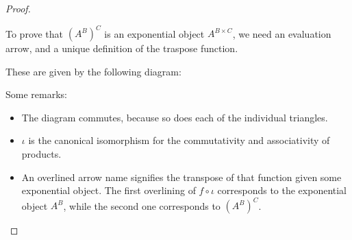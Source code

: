 \documentclass[a4paper,notitlepage]{article}
\begin{document}
\begin{enumerate}
\begin{enumerate}
\begin{proof}
\begin{description}
          To prove that $(A^B)^C$ is an exponential object $A^{B \times C}$,
          we need an evaluation arrow, and a unique definition
          of the traspose function.
            
          These are given by the following diagram: 
      

      Some remarks:

      \begin{itemize}
        \item The diagram commutes, because so does each of the individual
          triangles.
          
        \item $\iota$ is the canonical isomorphism for the commutativity and
      associativity of products. 

      \item An overlined arrow name signifies the transpose of that function
      given some exponential object. The first overlining of $f \circ ι$ corresponds to the
      exponential object $A^B$, while the second one corresponds to
      $(A^B)^C$.


\end{itemize}
\end{description}
\end{proof}
\end{enumerate}
\end{enumerate}
\end{document}
